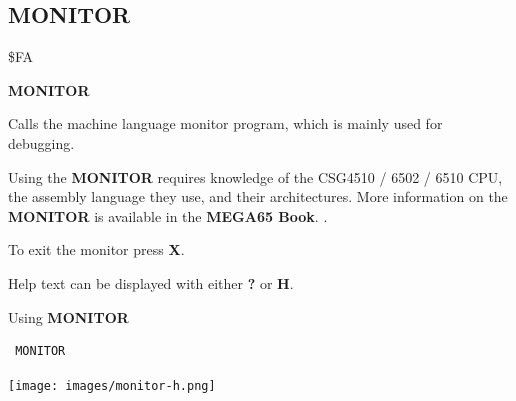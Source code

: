 \subsection{MONITOR}
\begin{description}[leftmargin=2cm,style=nextline]
\item [Token:] \$FA
\item [Format:] {\bf MONITOR}
\item [Usage:]  Calls the machine language
                monitor program, which is mainly used for
                debugging.

\item [Remarks:] Using the {\bf MONITOR} requires knowledge
                 of the CSG4510 / 6502 / 6510 CPU,
                 the assembly language they use, and their
                 architectures. More information on the
                 {\bf MONITOR} is available in
\ifdefined\printmanual
the {\bf MEGA65 Book}.
\else
{}.
\fi

                 To exit the monitor press {\bf X}.

                 Help text can be displayed with either {\bf ?} or {\bf H}.

\item [Example:] Using {\bf MONITOR}
\begin{tcolorbox}[colback=black,coltext=white]
\verbatimfont{\codefont}
\begin{verbatim}
 MONITOR
\end{verbatim}
\end{tcolorbox}
\item \begin{center}\texttt{[image: images/monitor-h.png]}\end{center}
\end{description}


\newpage
